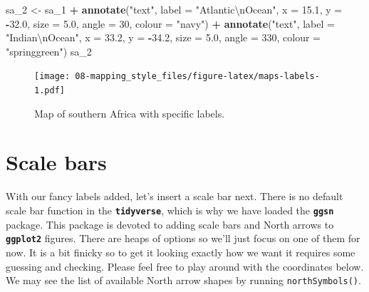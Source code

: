 \documentclass[]{book}
\newenvironment{Shaded}{\begin{snugshade}}{\end{snugshade}}
\newcommand{\KeywordTok}[1]{\textcolor[rgb]{0.13,0.29,0.53}{\textbf{#1}}}
\newcommand{\DataTypeTok}[1]{\textcolor[rgb]{0.13,0.29,0.53}{#1}}
\newcommand{\DecValTok}[1]{\textcolor[rgb]{0.00,0.00,0.81}{#1}}
\newcommand{\FloatTok}[1]{\textcolor[rgb]{0.00,0.00,0.81}{#1}}
\newcommand{\CharTok}[1]{\textcolor[rgb]{0.31,0.60,0.02}{#1}}
\newcommand{\StringTok}[1]{\textcolor[rgb]{0.31,0.60,0.02}{#1}}
\newcommand{\OperatorTok}[1]{\textcolor[rgb]{0.81,0.36,0.00}{\textbf{#1}}}
\newcommand{\NormalTok}[1]{#1}
\theoremstyle{definition}
\theoremstyle{definition}
\theoremstyle{definition}
\theoremstyle{remark}
\begin{document}
\begin{Shaded}
\begin{Highlighting}[]
\NormalTok{sa_}\DecValTok{2}\NormalTok{ <-}\StringTok{ }\NormalTok{sa_}\DecValTok{1} \OperatorTok{+}
\StringTok{  }\KeywordTok{annotate}\NormalTok{(}\StringTok{"text"}\NormalTok{, }\DataTypeTok{label =} \StringTok{"Atlantic}\CharTok{\textbackslash{}n}\StringTok{Ocean"}\NormalTok{, }
           \DataTypeTok{x =} \FloatTok{15.1}\NormalTok{, }\DataTypeTok{y =} \OperatorTok{-}\FloatTok{32.0}\NormalTok{, }
           \DataTypeTok{size =} \FloatTok{5.0}\NormalTok{, }
           \DataTypeTok{angle =} \DecValTok{30}\NormalTok{, }
           \DataTypeTok{colour =} \StringTok{"navy"}\NormalTok{) }\OperatorTok{+}
\StringTok{  }\KeywordTok{annotate}\NormalTok{(}\StringTok{"text"}\NormalTok{, }\DataTypeTok{label =} \StringTok{"Indian}\CharTok{\textbackslash{}n}\StringTok{Ocean"}\NormalTok{, }
           \DataTypeTok{x =} \FloatTok{33.2}\NormalTok{, }\DataTypeTok{y =} \OperatorTok{-}\FloatTok{34.2}\NormalTok{, }
           \DataTypeTok{size =} \FloatTok{5.0}\NormalTok{, }
           \DataTypeTok{angle =} \DecValTok{330}\NormalTok{, }
           \DataTypeTok{colour =} \StringTok{"springgreen"}\NormalTok{)}
\NormalTok{sa_}\DecValTok{2}
\end{Highlighting}
\end{Shaded}

\begin{figure}
\centering
\texttt{[image: 08-mapping\_style\_files/figure-latex/maps-labels-1.pdf]}
\caption{\label{fig:maps-labels}Map of southern Africa with specific
labels.}
\end{figure}

\section{Scale bars}\label{scale-bars}

With our fancy labels added, let's insert a scale bar next. There is no
default scale bar function in the \textbf{\texttt{tidyverse}}, which is
why we have loaded the \textbf{\texttt{ggsn}} package. This package is
devoted to adding scale bars and North arrows to
\textbf{\texttt{ggplot2}} figures. There are heaps of options so we'll
just focus on one of them for now. It is a bit finicky so to get it
looking exactly how we want it requires some guessing and checking.
Please feel free to play around with the coordinates below. We may see
the list of available North arrow shapes by running
\texttt{northSymbols()}.
\end{document}
